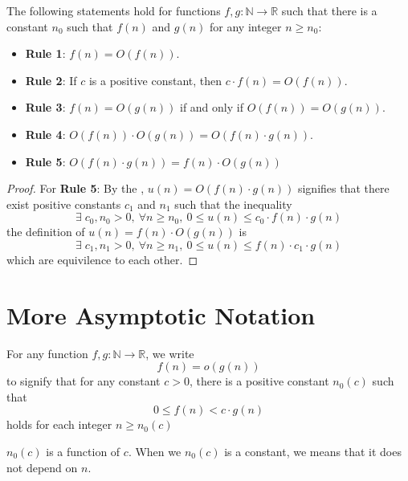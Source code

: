 \begin{theorem}
    The following statements hold for functions $f,g: \mathbb{N} \rightarrow \mathbb{R}$ such that there is a constant $n_0$ such that $f(n)$ and $g(n)$ for any integer $n \geq n_0$:
    \begin{itemize}
        \item \textbf{Rule 1}: $f(n) = O(f(n))$.
        \item \textbf{Rule 2}: If $c$ is a positive constant, then $c \cdot f(n) = O(f(n))$.
        \item \textbf{Rule 3}: $f(n) = O(g(n))$ if and only if $O(f(n)) = O(g(n))$.
        \item \textbf{Rule 4}: $O(f(n)) \cdot O(g(n)) = O(f(n) \cdot g(n))$.
        \item \textbf{Rule 5}: $O(f(n) \cdot g(n)) = f(n) \cdot O(g(n))$
    \end{itemize}
\end{theorem}
\begin{proof}
    For \textbf{Rule 5}: By the , $u(n) = O(f(n) \cdot g(n))$ signifies that there exist positive constants $c_1$ and $n_1$ such that the inequality 
    \[
        \exists \; c_0, n_0 > 0,\  \forall n \geq n_0,\ 0 \leq u(n) \leq c_0 \cdot f(n) \cdot g(n)
    \]
    the definition of $u(n) = f(n) \cdot O(g(n))$ is 
    \[
        \exists \; c_1, n_1 > 0,\  \forall n \geq n_1,\ 0 \leq u(n) \leq f(n) \cdot c_1 \cdot g(n)
    \]
    which are equivilence to each other.
\end{proof}

\section{More Asymptotic Notation}

\begin{definition}[Little-oh]
    For any function $f, g : \mathbb{N} \rightarrow \mathbb{R}$, we write
    \[
        f(n) = o(g(n))
    \]
    to signify that for any constant $c > 0$, there is a positive constant $n_0(c)$ such that
    \[
        0 \leq f(n) < c\cdot g(n)
    \]
    holds for each integer $n \geq n_0(c)$

    \begin{note}
        \(n_0(c)\) is a function of $c$. When we \(n_0(c)\) is a constant, we means that it does not depend on $n$.
    \end{note}
\end{definition}

